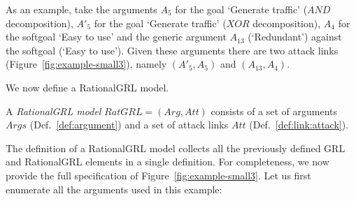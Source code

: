 As an example, take the arguments $A_5$ for the goal `Generate traffic' ($AND$ decomposition), $A'_5$ for the goal `Generate traffic' ($XOR$ decomposition), $A_4$ for the softgoal `Easy to use' and the generic argument $A_{13}$ (`Redundant') against the softgoal (`Easy to use'). Given these arguments there are two attack links (Figure~\ref{fig:example-small3}), namely $(A'_{5},A_{5})$ and $(A_{13}, A_{4})$.

We now define a RationalGRL model.

\begin{definition}
\label{def:rationalgrl-model}
A \emph{RationalGRL model} $RatGRL=(Arg, Att)$ consists of a set of arguments $Args$ (Def.~\ref{def:argument}) and a set of attack links $Att$ (Def.~\ref{def:link:attack}).
\end{definition}

The definition of a RationalGRL model collects all the previously defined GRL and RationalGRL elements in a single definition. For completeness, we now provide the full specification of Figure~\ref{fig:example-small3}. Let us first enumerate all the arguments used in this example:

